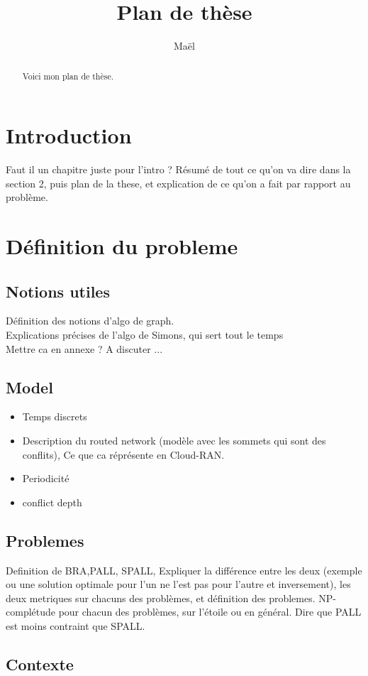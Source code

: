\documentclass[a4paper,10pt]{article}
\title{Plan de thèse}
\author{Maël}
\begin{document}
\maketitle

\begin{abstract}
Voici mon plan de thèse.
\end{abstract}
\section{Introduction}
Faut il un chapitre juste pour l'intro ?
Résumé  de tout ce qu'on va dire dans la section 2, puis plan de la these, et explication de ce qu'on a fait par rapport au problème.
\section{Définition du probleme}

\subsection{Notions utiles}
Définition des notions d'algo de graph.\\
Explications précises de l'algo de Simons, qui sert tout le temps \\
Mettre ca en annexe ?
A discuter ...
\subsection{Model}
\begin{itemize}
 \item Temps discrets
 \item Description du routed network (modèle avec les sommets qui sont des conflits), Ce que ca réprésente en Cloud-RAN.
 \item Periodicité
 \item conflict depth
 
\end{itemize}
\subsection{Problemes}
Definition de BRA,PALL, SPALL, Expliquer la différence entre les deux (exemple ou une solution optimale pour l'un ne l'est pas pour l'autre et inversement), les deux metriques sur chacuns des problèmes, et définition des problemes. NP-complétude pour chacun des problèmes, sur l'étoile ou en général.
Dire que PALL est moins contraint que SPALL.
\subsection{Contexte}
\end{document}
